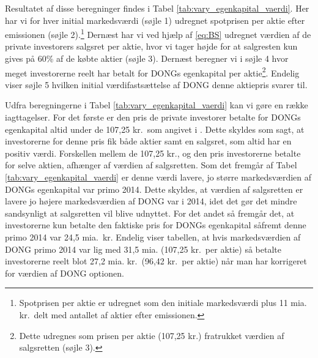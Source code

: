 \documentclass{article}
\begin{document}
Resultatet af disse beregninger findes i Tabel \ref{tab:vary_egenkapital_vaerdi}. Her har vi for hver initial markedsværdi (søjle 1) udregnet spotprisen per aktie efter emissionen (søjle 2).\footnote{Spotprisen per aktie er udregnet som den initiale markedsværdi plus 11 mia. kr.\ delt med antallet af aktier efter emissionen.} Dernæst har vi ved hjælp af \eqref{eq:BS} udregnet værdien af de private investorers salgsret per aktie, hvor vi tager højde for at salgresten kun gives på 60\% af de købte aktier (søjle 3). Dernæst  beregner vi i søjle 4 hvor meget investorerne reelt har betalt for DONGs egenkapital per aktie\footnote{Dette udregnes som prisen per aktie (107,25 kr.) fratrukket værdien af salgsretten (søjle 3).}. Endelig viser søjle 5 hvilken initial værdifastsættelse af DONG denne aktiepris svarer til. 
 
Udfra beregningerne i Tabel \ref{tab:vary_egenkapital_vaerdi} kan vi gøre en række iagttagelser. For det første er den pris de private investorer betalte for DONGs egenkapital altid under de 107,25 kr.\ som angivet i \citep{FM2013a}. Dette skyldes som sagt, at investorerne for denne pris fik både aktier samt en salgsret, som altid har en positiv værdi. Forskellen mellem de 107,25 kr., og den pris investorerne betalte for selve aktien, afhænger af værdien af salgsretten. Som det fremgår af Tabel \ref{tab:vary_egenkapital_vaerdi} er denne værdi lavere, jo større markedsværdien af DONGs egenkapital var primo 2014. Dette skyldes, at værdien af salgsretten er lavere jo højere markedsværdien af DONG var i 2014, idet det gør det mindre sandsynligt at salgsretten vil blive udnyttet. For det andet så fremgår det, at investorerne kun betalte den faktiske pris for DONGs egenkapital såfremt denne primo 2014 var 24,5 mia.\ kr. Endelig viser tabellen, at hvis markedsværdien af DONG primo 2014 var lig med 31,5 mia. (107,25 kr.\ per aktie) så betalte investorerne reelt blot 27,2 mia. kr.\ (96,42 kr.\ per aktie) når man har korrigeret for værdien af DONG optionen.
\end{document}
